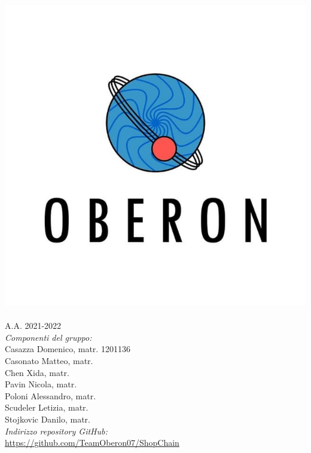 \thispagestyle{empty}
\begin{titlepage}
	\begin{center}
		
		\includegraphics[scale = 0.2]{../latex/images/loghi/logo.jpg}\\[1cm]
\Huge \textsc{\doctitle{}}\\ [0.75cm]                          
\Large \textsf{A.A. 2021-2022} \\ [1cm]

\Large \textsl{Componenti del gruppo:} \\[0.25cm] \textsf{Casazza Domenico, matr. 1201136} \\ [0.1cm]
\Large \textsf{Casonato Matteo, matr. } \\ [0.1cm]
\Large \textsf{Chen Xida, matr. } \\ [0.1cm]
\Large \textsf{Pavin Nicola, matr. } \\ [0.1cm]
\Large \textsf{Poloni Alessandro​, matr. } \\ [0.1cm]
\Large \textsf{Scudeler Letizia​, matr. } \\ [0.1cm]
\Large \textsf{Stojkovic Danilo​​, matr. } \\ [1cm]
                
\Large \textsl{Indirizzo repository GitHub:} \\ \textsf{\href{https://github.com/TeamOberon07/ShopChain}{https://github.com/TeamOberon07/ShopChain}}\\[0.5cm]


\end{center}
\end{titlepage}
